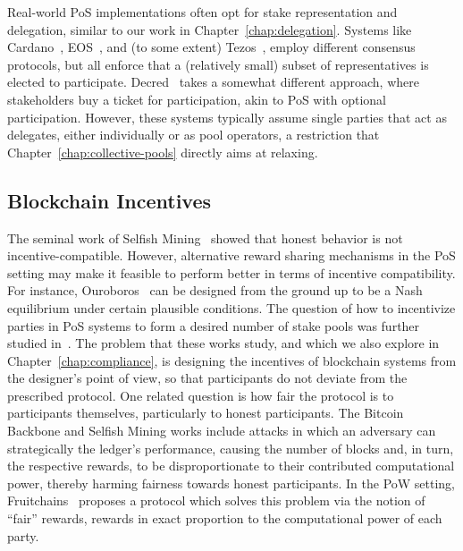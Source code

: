 Real-world PoS implementations often opt for stake representation and
delegation, similar to our work in Chapter~\ref{chap:delegation}.  Systems like
Cardano~\cite{cardano}, EOS~\cite{eosWhitepaper}, and (to
some extent) Tezos~\cite{goodman2014tezos}, employ different consensus
protocols, but all enforce that a (relatively small) subset of representatives
is elected to participate.  Decred~\cite{decred} takes a somewhat different
approach, where stakeholders buy a ticket for participation, akin to PoS with
optional participation. However, these systems typically assume single parties
that act as delegates, either individually or as pool operators, a restriction
that Chapter~\ref{chap:collective-pools} directly aims at relaxing.

\subsection{Blockchain Incentives}
The seminal work of Selfish
Mining~\cite{FC:EyaSir14,FC:SapSomZoh16,kiayias2016blockchain} showed that
honest behavior is not incentive-compatible. However, alternative reward
sharing mechanisms in the PoS setting may make it feasible to perform better in
terms of incentive compatibility. For instance, Ouroboros~\cite{C:KRDO17} can
be designed from the ground up to be a Nash equilibrium under certain plausible
conditions. The question of how to incentivize parties in PoS systems to form a
desired number of stake pools was further studied
in~\cite{DBLP:conf/eurosp/BrunjesKKS20}. The problem that these works study,
and which we also explore in Chapter~\ref{chap:compliance}, is designing the
incentives of blockchain systems from the designer's point of view, so that
participants do not deviate from the prescribed protocol. One related question
is how fair the protocol is to participants themselves, particularly to honest
participants. The Bitcoin Backbone and Selfish Mining works include attacks in
which an adversary can strategically the ledger's performance, causing the
number of blocks and, in turn, the respective rewards, to be disproportionate
to their contributed computational power, thereby harming fairness towards
honest participants. In the PoW setting, Fruitchains~\cite{PODC:PasShi17}
proposes a protocol which solves this problem via the notion of ``fair''
rewards, \ie rewards in exact proportion to the computational power of each
party.

